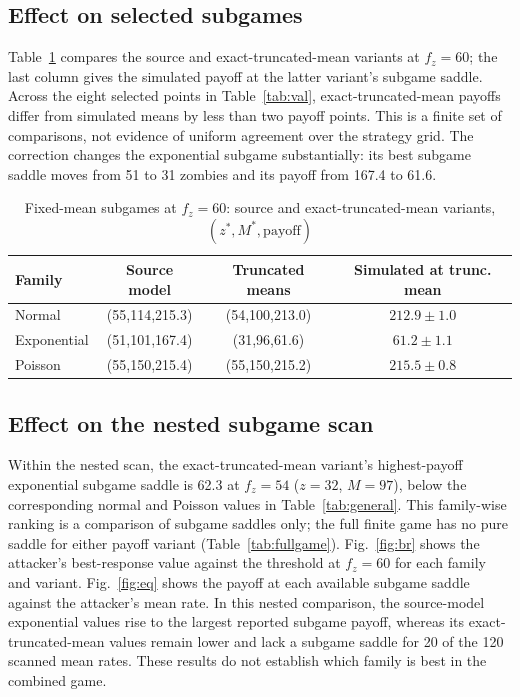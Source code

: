 \documentclass[conference]{IEEEtran}
\begin{document}
\subsection{Effect on selected subgames}
Table~\ref{tab:sub2} compares the source and exact-truncated-mean variants at $f_z{=}60$; the last column gives the simulated payoff at the latter variant's subgame saddle. Across the eight selected points in Table~\ref{tab:val}, exact-truncated-mean payoffs differ from simulated means by less than two payoff points. This is a finite set of comparisons, not evidence of uniform agreement over the strategy grid. The correction changes the exponential subgame substantially: its best subgame saddle moves from 51 to 31 zombies and its payoff from 167.4 to 61.6.

\begin{table}[t]
\caption{Fixed-mean subgames at $f_z{=}60$: source and exact-truncated-mean variants, $(z^*,M^*,\text{payoff})$}
\label{tab:sub2}
\centering\scriptsize
\begin{tabular}{lccc}
\toprule
Family & Source model & Truncated means & Simulated at trunc. mean\\
\midrule
Normal & (55,114,215.3) & (54,100,213.0) & $212.9\pm1.0$\\
Exponential & (51,101,167.4) & (31,96,61.6) & $61.2\pm1.1$\\
Poisson & (55,150,215.4) & (55,150,215.2) & $215.5\pm0.8$\\
\bottomrule
\end{tabular}
\end{table}

\subsection{Effect on the nested subgame scan}
Within the nested scan, the exact-truncated-mean variant's highest-payoff exponential subgame saddle is 62.3 at $f_z{=}54$ ($z{=}32$, $M{=}97$), below the corresponding normal and Poisson values in Table~\ref{tab:general}. This family-wise ranking is a comparison of subgame saddles only; the full finite game has no pure saddle for either payoff variant (Table~\ref{tab:fullgame}). Fig.~\ref{fig:br} shows the attacker's best-response value against the threshold at $f_z{=}60$ for each family and variant. Fig.~\ref{fig:eq} shows the payoff at each available subgame saddle against the attacker's mean rate. In this nested comparison, the source-model exponential values rise to the largest reported subgame payoff, whereas its exact-truncated-mean values remain lower and lack a subgame saddle for 20 of the 120 scanned mean rates. These results do not establish which family is best in the combined game.
\end{document}
